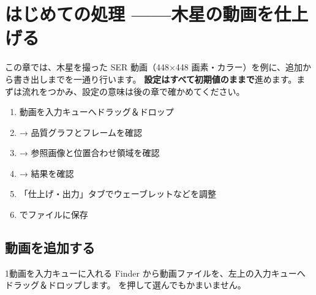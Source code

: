\chapter{はじめての処理 ——木星の動画を仕上げる}\label{chap:quickstart}

この章では、木星を撮った SER 動画（448×448 画素・カラー）を例に、追加から書き出しまでを一通り行います。
\textbf{設定はすべて初期値のままで}進めます。まずは流れをつかみ、設定の意味は後の章で確かめてください。

\begin{point}[この章の手順の早見表]
  \begin{enumerate}[label=\arabic*., itemsep=0pt, topsep=2pt]
    \item 動画を入力キューへドラッグ＆ドロップ
    \item {} → 品質グラフとフレームを確認
    \item {} → 参照画像と位置合わせ領域を確認
    \item {} → 結果を確認
    \item 「仕上げ・出力」タブでウェーブレットなどを調整
    \item {} でファイルに保存
  \end{enumerate}
\end{point}

\section{動画を追加する}\label{sec:qs-add}

\begin{step}{1}{動画を入力キューに入れる}
  Finder から動画ファイルを、左上の入力キューへドラッグ＆ドロップします。 を押して選んでもかまいません。
\end{step}


